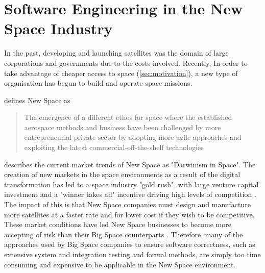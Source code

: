 \documentclass[../report.tex]{subfiles}
\begin{document}
\section{Software Engineering in the New Space Industry}

In the past, developing and launching satellites was the domain of large
corporations and governments due to the costs involved. Recently, In order to
take advantage of cheaper access to space (\autoref{sec:motivation}), a new
type of organisation has begun to build and operate space missions.

\citet{Sweeting_2018} defines New Space as
\begin{quote}
    The emergence of a different ethos for space where the established
    aerospace methods and business have been challenged by more entrepreneurial
    private sector by adopting more agile approaches and exploiting the latest
    commercial-off-the-shelf technologies
\end{quote}

\citet{Denis_2020} describes the current market trends of New Space as
"Darwinism in Space". The creation of new markets in the space environments as
a result of the digital transformation has led to a space industry "gold rush",
with large venture capital investment and a "winner takes all" incentive
driving high levels of competition \citep{Denis_2020}. The impact of this is
that New Space companies must design and manufacture more satellites at a
faster rate and for lower cost if they wish to be competitive. These market
conditions have led New Space businesses to become more accepting of risk than
their Big Space counterparts \citep{Cratere_2024}. Therefore, many of the
approaches used by Big Space companies to ensure software correctness, such as
extensive system and integration testing and formal methods, are simply too time
consuming and expensive to be applicable in the New Space environment.


\end{document}
